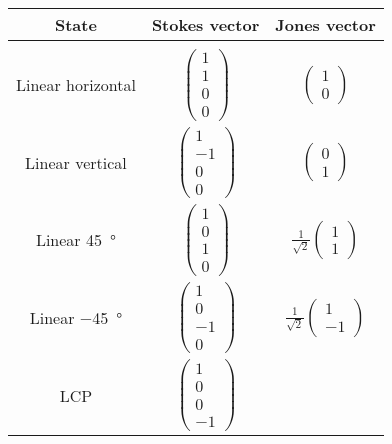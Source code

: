 \documentclass{standalone}
\begin{document}
    \begin{tabular}{c c c}
        \toprule
        State & Stokes vector & Jones vector \\ 
        \midrule\\
        \addlinespace[-2ex]
        Linear horizontal & 
        $\begin{pmatrix} 1 \\ 1 \\ 0 \\ 0 \end{pmatrix}$ & 
        $\begin{pmatrix} 1 \\ 0 \end{pmatrix}$  \\
        \addlinespace[1.5ex]
        Linear vertical & 
        $\begin{pmatrix} 1 \\ -1 \\ 0 \\ 0 \end{pmatrix}$ & 
        $\begin{pmatrix} 0 \\ 1 \end{pmatrix}$  \\
        \addlinespace[1.5ex]
        Linear \SI{+45}{\degree} & 
        $\begin{pmatrix} 1 \\ 0 \\ 1 \\ 0 \end{pmatrix}$ & 
        $\frac{1}{\sqrt{2}}\begin{pmatrix} 1 \\ 1 \end{pmatrix}$  \\
        \addlinespace[1.5ex]
        Linear \SI{-45}{\degree} & 
        $\begin{pmatrix} 1 \\ 0 \\ -1 \\ 0 \end{pmatrix}$ & 
        $\frac{1}{\sqrt{2}}\begin{pmatrix} 1 \\ -1 \end{pmatrix}$  \\
        \addlinespace[1.5ex]
        LCP & 
        $\begin{pmatrix} 1 \\ 0 \\ 0 \\ -1 \end{pmatrix}$ & 

\end{tabular}
\end{document}
